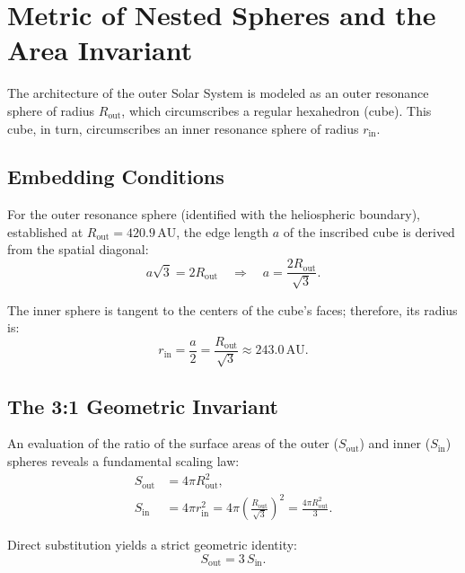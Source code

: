 \documentclass[11pt,a4paper]{article}
\theoremstyle{remark}
\newcommand{\AU}{\,\mathrm{AU}}
\begin{document}
\section{Metric of Nested Spheres and the Area Invariant}

The architecture of the outer Solar System is modeled as an outer resonance sphere of radius $R_{\text{out}}$, which circumscribes a regular hexahedron (cube). This cube, in turn, circumscribes an inner resonance sphere of radius $r_{\text{in}}$.

\subsection{Embedding Conditions}

For the outer resonance sphere (identified with the heliospheric boundary), established at $R_{\text{out}} = 420.9\AU$, the edge length $a$ of the inscribed cube is derived from the spatial diagonal:
\begin{equation}
    a\sqrt{3} = 2R_{\text{out}} \quad \Longrightarrow \quad a = \frac{2R_{\text{out}}}{\sqrt{3}}.
    \label{eq:cube_edge}
\end{equation}

The inner sphere is tangent to the centers of the cube's faces; therefore, its radius is:
\begin{equation}
    r_{\text{in}} = \frac{a}{2} = \frac{R_{\text{out}}}{\sqrt{3}} \approx 243.0\AU.
    \label{eq:inner_radius}
\end{equation}

\subsection{The 3:1 Geometric Invariant}

An evaluation of the ratio of the surface areas of the outer ($S_{\text{out}}$) and inner ($S_{\text{in}}$) spheres reveals a fundamental scaling law:
\begin{align}
    S_{\text{out}} &= 4\pi R_{\text{out}}^2, \label{eq:s_out}\\
    S_{\text{in}}  &= 4\pi r_{\text{in}}^2 = 4\pi \left( \frac{R_{\text{out}}}{\sqrt{3}} \right)^2 = \frac{4\pi R_{\text{out}}^2}{3}. \label{eq:s_in}
\end{align}

Direct substitution yields a strict geometric identity:
\begin{equation}
    \boxed{S_{\text{out}} = 3\,S_{\text{in}}}.
    \label{eq:area_invariant}
\end{equation}
\end{document}
